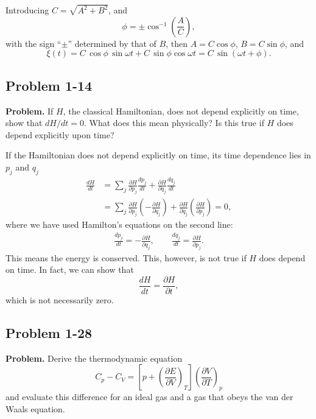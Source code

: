 \documentclass[twocolumn, 10pt]{article}
\numberwithin{equation}{section}
\newenvironment{problem}
{\par\medskip \color{problue}
  \textbf{Problem. }\ignorespaces}
{\medskip}
\newenvironment{solution}[1][\empty]
{\par\medskip\sffamily
  \textbf{\ifx\empty#1{Solution.}\relax\else{#1}\fi} \ignorespaces}
{\medskip}
\begin{document}
\begin{solution}
Introducing $C = \sqrt{A^2 + B^2}$,
and
$$\phi = \pm \cos^{-1} \left( \frac A C \right),$$
with the sign ``$\pm$'' determined by that of $B$,
then $A = C \cos\phi$, $B = C \sin\phi$, and
$$
\xi(t) = C \, \cos\phi \, \sin \omega t + C \, \sin\phi \cos \omega t
= C \, \sin(\omega t + \phi).
$$
\end{solution}


\subsection{Problem 1-14}

\begin{problem}
If $H$, the classical Hamiltonian, does not depend explicitly on time,
show that $dH/dt = 0$.
What does this mean physically?
Is this true if $H$ does depend explicitly upon time?
\end{problem}

\begin{solution}
If the Hamiltonian does not depend explicitly on time,
its time dependence lies in $p_j$ and $q_j$
\begin{align*}
  \frac{dH}{dt}
  &= \sum_j
  \frac{ \partial H } { \partial p_j}
  \frac{ d p_j } { d t }
   +
  \frac{ \partial H } { \partial q_j}
  \frac{ d q_j } { d t }
  \\
  &= \sum_j
  \frac{ \partial H } { \partial p_j}
  \left( - \frac{ \partial H } { \partial q_j} \right)
   +
  \frac{ \partial H } { \partial q_j}
  \left( \frac{ \partial H } { \partial p_j} \right)
  = 0,
\end{align*}
where we have used Hamilton's equations
on the second line:
\begin{align*}
  \frac{ d p_j } { d t }
  =
  - \frac{ \partial H } { \partial q_j}
  ,
  \qquad
  \frac{ d q_j } { d t }
  = \frac{ \partial H } { \partial p_j}
  .
\end{align*}
This means the energy is conserved.
This, however, is not true if $H$ does depend on time.
%
In fact, we can show that
$$
  \frac{ d H } { d t }
  =
  \frac{ \partial H } { \partial t }
  ,
$$
which is not necessarily zero.
\end{solution}


\subsection{Problem 1-28}

\begin{problem}
  Derive the thermodynamic equation
  \begin{equation}
    C_p - C_V
    = \left[ p + \left( \frac{ \partial E } { \partial V } \right)_T \right]
    \left( \frac{ \partial V } { \partial T } \right)_p
    \label{eq:CpCV1}
  \end{equation}
  and evaluate this difference for an ideal gas
  and a gas that obeys the van der Waals equation.
\end{problem}
\end{document}
